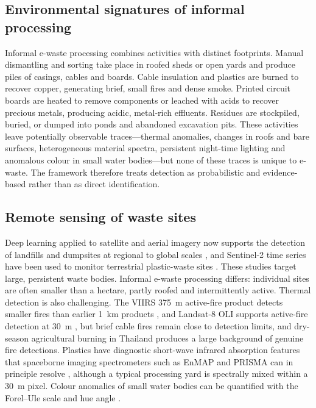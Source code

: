 \documentclass[10pt]{article}
\begin{document}
\subsection{Environmental signatures of informal processing}
Informal e-waste processing combines activities with distinct footprints. Manual dismantling and sorting take place in roofed sheds or open yards and produce piles of casings, cables and boards. Cable insulation and plastics are burned to recover copper, generating brief, small fires and dense smoke. Printed circuit boards are heated to remove components or leached with acids to recover precious metals, producing acidic, metal-rich effluents. Residues are stockpiled, buried, or dumped into ponds and abandoned excavation pits. These activities leave potentially observable traces---thermal anomalies, changes in roofs and bare surfaces, heterogeneous material spectra, persistent night-time lighting and anomalous colour in small water bodies---but none of these traces is unique to e-waste. The framework therefore treats detection as probabilistic and evidence-based rather than as direct identification.

\subsection{Remote sensing of waste sites}
Deep learning applied to satellite and aerial imagery now supports the detection of landfills and dumpsites at regional to global scales \citep{sun2023,torres2023}, and Sentinel-2 time series have been used to monitor terrestrial plastic-waste sites \citep{kruse2023}. These studies target large, persistent waste bodies. Informal e-waste processing differs: individual sites are often smaller than a hectare, partly roofed and intermittently active. Thermal detection is also challenging. The VIIRS 375~m active-fire product detects smaller fires than earlier 1~km products \citep{schroeder2014}, and Landsat-8 OLI supports active-fire detection at 30~m \citep{schroeder2016}, but brief cable fires remain close to detection limits, and dry-season agricultural burning in Thailand produces a large background of genuine fire detections. Plastics have diagnostic short-wave infrared absorption features \citep{garaba2018} that spaceborne imaging spectrometers such as EnMAP and PRISMA can in principle resolve \citep{guanter2015,cogliati2021}, although a typical processing yard is spectrally mixed within a 30~m pixel. Colour anomalies of small water bodies can be quantified with the Forel--Ule scale and hue angle \citep{vanderwoerd2015}.
\end{document}
